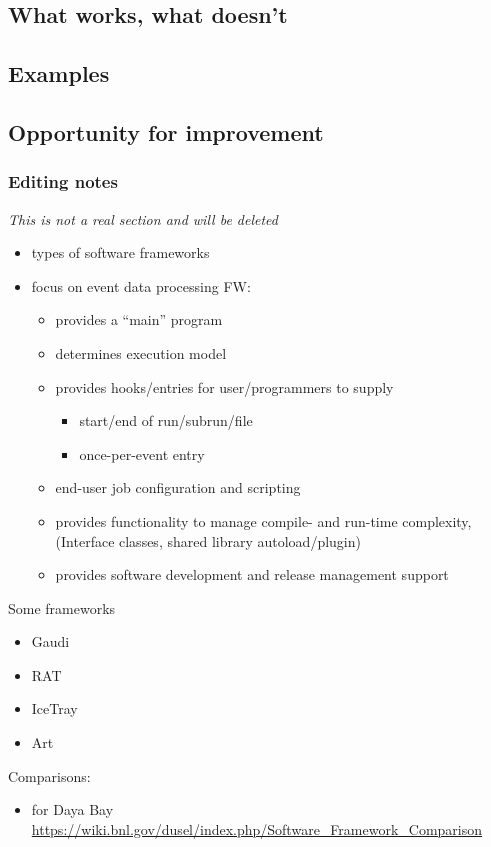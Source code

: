 \subsection{What works, what doesn't}
\subsection{Examples}
\subsection{Opportunity for improvement}




\subsubsection{Editing notes}



\textit{This is not a real section and will be deleted}

\begin{itemize}
\item types of software frameworks
\item focus on event data processing FW:
  \begin{itemize}
  \item provides a ``main'' program
  \item determines execution model
  \item provides hooks/entries for user/programmers to supply
    \begin{itemize}
    \item start/end of run/subrun/file
    \item once-per-event entry
    \end{itemize}
  \item end-user job configuration and scripting
  \item provides functionality to manage compile- and run-time complexity, (Interface classes, shared library autoload/plugin)
  \item provides software development and release management support
  \end{itemize}
\end{itemize}
Some frameworks
\begin{itemize}
\item Gaudi
\item RAT
\item IceTray
\item Art
\end{itemize}
Comparisons:
\begin{itemize}
\item for Daya Bay \url{https://wiki.bnl.gov/dusel/index.php/Software_Framework_Comparison}
\end{itemize}
